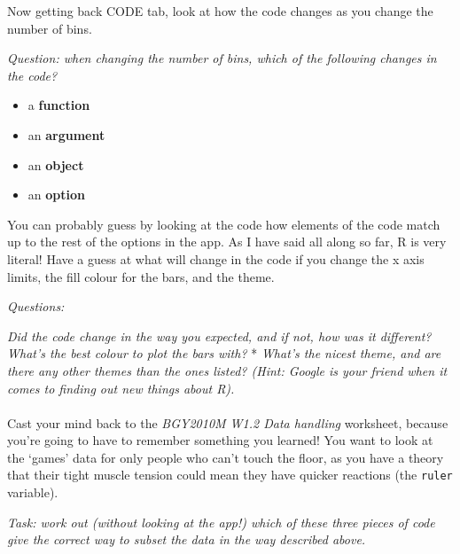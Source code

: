 \documentclass[
]{book}
\newenvironment{Shaded}{\begin{snugshade}}{\end{snugshade}}
\newcommand{\CommentTok}[1]{\textcolor[rgb]{0.56,0.35,0.01}{\textit{#1}}}
\newcommand{\DecValTok}[1]{\textcolor[rgb]{0.00,0.00,0.81}{#1}}
\newcommand{\KeywordTok}[1]{\textcolor[rgb]{0.13,0.29,0.53}{\textbf{#1}}}
\newcommand{\NormalTok}[1]{#1}
\newcommand{\OperatorTok}[1]{\textcolor[rgb]{0.81,0.36,0.00}{\textbf{#1}}}
\newcommand{\StringTok}[1]{\textcolor[rgb]{0.31,0.60,0.02}{#1}}
\providecommand{\tightlist}{%
  \setlength{\itemsep}{0pt}\setlength{\parskip}{0pt}}
\begin{document}
Now getting back CODE tab, look at how the code changes as you change the number of bins.

\emph{Question: when changing the number of bins, which of the following changes in
the code?}

\begin{itemize}
\tightlist
\item
  a \textbf{function}
\item
  an \textbf{argument}
\item
  an \textbf{object}
\item
  an \textbf{option}\\
\end{itemize}

You can probably guess by looking at the code how elements of the code match up to the rest of the options in the app.
As I have said all along so far, R is very literal! Have a guess at what
will change in the code if you change the x axis limits, the fill colour for
the bars, and the theme.

\emph{Questions:}

\emph{\emph{Did the code change in the way you expected, and if not, how was it different? }
} \emph{What's the best colour to plot the bars with? }
* \emph{What's the nicest theme, and are there any other themes than the ones listed?
(Hint: Google is your friend when it comes to finding out new things about R).}\\
~\\

Cast your mind back to the \emph{BGY2010M W1.2 Data handling} worksheet, because
you're going to have to remember something you learned! You want to look
at the `games' data for only people who can't touch the floor, as you have a theory
that their tight muscle tension could mean they have quicker reactions
(the \texttt{ruler} variable).

\emph{Task: work out (without looking at the app!) which of these three pieces of code
give the correct way to subset the data in the way described above.}

\begin{Shaded}
\end{Shaded}
\end{document}
